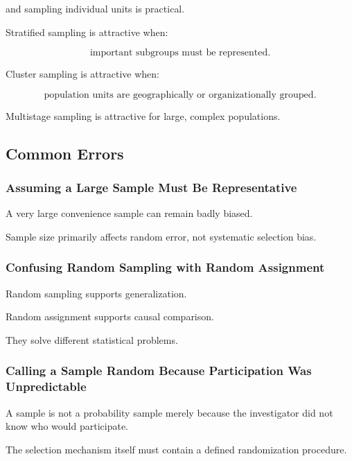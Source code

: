 and sampling individual units is practical.

Stratified sampling is attractive when:

\[
\boxed{
\text{important subgroups must be represented}.
}
\]

Cluster sampling is attractive when:

\[
\boxed{
\text{population units are geographically or organizationally grouped}.
}
\]

Multistage sampling is attractive for large, complex populations.

\subsection{Common Errors}
\label{subsec:data-collection-common-errors}

\subsubsection{Assuming a Large Sample Must Be Representative}

A very large convenience sample can remain badly biased.

Sample size primarily affects random error, not systematic selection
bias.

\subsubsection{Confusing Random Sampling with Random Assignment}

Random sampling supports generalization.

Random assignment supports causal comparison.

They solve different statistical problems.

\subsubsection{Calling a Sample Random Because Participation Was Unpredictable}

A sample is not a probability sample merely because the investigator did
not know who would participate.

The selection mechanism itself must contain a defined randomization
procedure.

